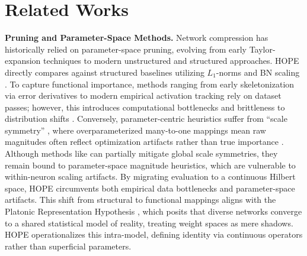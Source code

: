 \documentclass[11pt, a4paper, copyright, gdm]{google}
\theoremstyle{definition}
\begin{document}
\section{Related Works}
\label{sec:related_works}
\noindent \textbf{Pruning and Parameter-Space Methods.} Network compression has historically relied on parameter-space pruning, evolving from early Taylor-expansion techniques \cite{lecun1989optimal, hassibi1993optimal} to modern unstructured \cite{han2015learning, frankle2019lottery} and structured \cite{he2017channel, wen2016learning} approaches. HOPE directly compares against structured baselines utilizing $L_1$-norms \cite{li2016pruning} and BN scaling \cite{liu2017learning}. To capture functional importance, methods ranging from early skeletonization via error derivatives \cite{mozer1989skeletonization} to modern empirical activation tracking \cite{molchanov2016pruning, molchanov2019importance, singh2020woodfisher, luo2017thinet} rely on dataset passes; however, this introduces computational bottlenecks and brittleness to distribution shifts \cite{hooker2019what}. Conversely, parameter-centric heuristics suffer from ``scale symmetry'' \cite{blalock2020state, renda2020comparing, badrinarayanan2015understanding, dinh2017sharp}, where overparameterized many-to-one mappings \cite{neyshabur2015search} mean raw magnitudes often reflect optimization artifacts rather than true importance \cite{Scholl2021, Tanaka2020PruningNN, hooker2019what}. Although methods like \cite{lee2021layer} can partially mitigate global scale symmetries, they remain bound to parameter-space magnitude heuristics, which are vulnerable to within-neuron scaling artifacts. By migrating evaluation to a continuous Hilbert space, HOPE circumvents both empirical data bottlenecks and parameter-space artifacts. This shift from structural to functional mappings aligns with the Platonic Representation Hypothesis \cite{huh2024platonic}, which posits that diverse networks converge to a shared statistical model of reality, treating weight spaces as mere shadows. HOPE operationalizes this intra-model, defining identity via continuous operators rather than superficial parameters.
\end{document}
